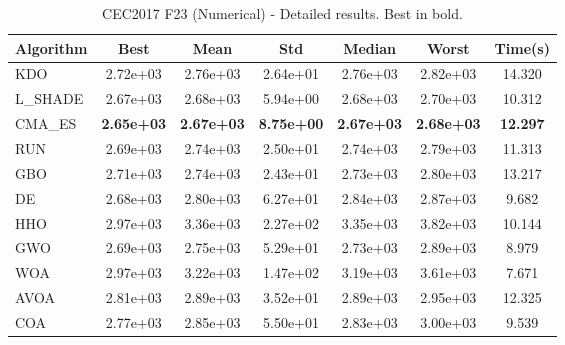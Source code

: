 \begin{table}[H]
\centering\small
\caption{CEC2017 F23 (Numerical) - Detailed results. Best in bold.}
\label{tab:cec2017_F23}
\begin{tabular}{lcccccc}
\toprule
\textbf{Algorithm} & \textbf{Best} & \textbf{Mean} & \textbf{Std} & \textbf{Median} & \textbf{Worst} & \textbf{Time(s)} \\
\midrule
KDO & 2.72e+03 & 2.76e+03 & 2.64e+01 & 2.76e+03 & 2.82e+03 & 14.320 \\
L_SHADE & 2.67e+03 & 2.68e+03 & 5.94e+00 & 2.68e+03 & 2.70e+03 & 10.312 \\
CMA_ES & \textbf{2.65e+03} & \textbf{2.67e+03} & \textbf{8.75e+00} & \textbf{2.67e+03} & \textbf{2.68e+03} & \textbf{12.297} \\
RUN & 2.69e+03 & 2.74e+03 & 2.50e+01 & 2.74e+03 & 2.79e+03 & 11.313 \\
GBO & 2.71e+03 & 2.74e+03 & 2.43e+01 & 2.73e+03 & 2.80e+03 & 13.217 \\
DE & 2.68e+03 & 2.80e+03 & 6.27e+01 & 2.84e+03 & 2.87e+03 & 9.682 \\
HHO & 2.97e+03 & 3.36e+03 & 2.27e+02 & 3.35e+03 & 3.82e+03 & 10.144 \\
GWO & 2.69e+03 & 2.75e+03 & 5.29e+01 & 2.73e+03 & 2.89e+03 & 8.979 \\
WOA & 2.97e+03 & 3.22e+03 & 1.47e+02 & 3.19e+03 & 3.61e+03 & 7.671 \\
AVOA & 2.81e+03 & 2.89e+03 & 3.52e+01 & 2.89e+03 & 2.95e+03 & 12.325 \\
COA & 2.77e+03 & 2.85e+03 & 5.50e+01 & 2.83e+03 & 3.00e+03 & 9.539 \\
\bottomrule
\end{tabular}
\end{table}
